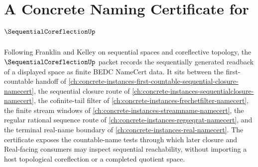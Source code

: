 \chapter{A Concrete Naming Certificate for $\SequentialCoreflectionUp$}
\label{ch:concrete-instances-sequential-coreflection-namecert}

Following Franklin and Kelley on sequential spaces and coreflective topology, the $\SequentialCoreflectionUp$ packet records the sequentially generated readback of a displayed space as finite BEDC NameCert data. It sits between the first-countable handoff of \autoref{ch:concrete-instances-first-countable-sequential-closure-namecert}, the sequential closure route of \autoref{ch:concrete-instances-sequentialclosure-namecert}, the cofinite-tail filter of \autoref{ch:concrete-instances-frechetfilter-namecert}, the finite stream windows of \autoref{ch:concrete-instances-streamname-namecert}, the regular rational sequence route of \autoref{ch:concrete-instances-regseqrat-namecert}, and the terminal real-name boundary of \autoref{ch:concrete-instances-real-namecert}. The certificate exposes the countable-name tests through which later closure and Real-facing consumers may inspect sequential reachability, without importing a host topological coreflection or a completed quotient space.

